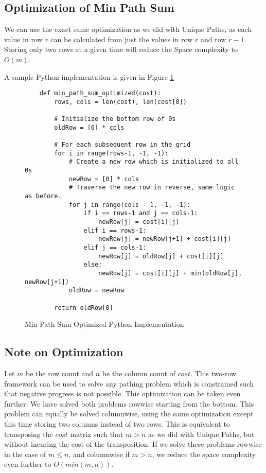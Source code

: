 \subsection{Optimization of Min Path Sum}
We can use the exact same optimization as we did with Unique Paths, as each value in row $r$ can be calculated from just the values in row $r$ and row $r-1$.
Storing only two rows at a given time will reduce the Space complexity to $O(m)$.

A sample Python implementation is given in Figure \ref{fig:min-path-sum-optimized}
\begin{figure}[H]
    \centering
    \begin{lstlisting}
    def min_path_sum_optimized(cost):
        rows, cols = len(cost), len(cost[0])
        
        # Initialize the bottom row of 0s
        oldRow = [0] * cols
    
        # For each subsequent row in the grid
        for i in range(rows-1, -1, -1):
            # Create a new row which is initialized to all 0s
            newRow = [0] * cols
            # Traverse the new row in reverse, same logic as before.
            for j in range(cols - 1, -1, -1):
                if i == rows-1 and j == cols-1:
                    newRow[j] = cost[i][j]
                elif i == rows-1:
                    newRow[j] = newRow[j+1] + cost[i][j]
                elif j == cols-1:
                    newRow[j] = oldRow[j] + cost[i][j]
                else:
                    newRow[j] = cost[i][j] + min(oldRow[j], newRow[j+1])
            oldRow = newRow
    
        return oldRow[0]
    \end{lstlisting}
    \caption{Min Path Sum Optimized Python Implementation}
    \label{fig:min-path-sum-optimized}
\end{figure}
\subsection{Note on Optimization}
Let $m$ be the row count and $n$ be the column count of $cost$.
This two-row framework can be used to solve any pathing problem which is constrained such that negative progress is not possible.
This optimization can be taken even further. We have solved both problems rowwise starting from the bottom. This problem can equally be solved columnwise,
using the same optimization except this time storing two columns instead of two rows.
This is equivalent to transposing the $cost$ matrix such that $m > n$ as we did with Unique Paths, but without incuring the cost of the transposition.
If we solve these problems rowwise in the case of $m \leq n$, and columnwise if $m > n$, we reduce the space complexity even further to $O(min(m,n))$.